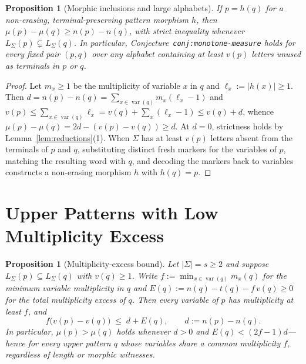 \documentclass[11pt]{article}
\theoremstyle{plain}
\newtheorem{proposition}[theorem]{Proposition}
\theoremstyle{definition}
\theoremstyle{remark}
\DeclareMathOperator{\var}{var}
\begin{document}
\begin{proposition}[Morphic inclusions and large alphabets]\label{prop:morphic}
If $p = h(q)$ for a non-erasing, terminal-preserving pattern morphism $h$, then $\mu(p) - \mu(q) \ge n(p) - n(q)$, with strict inequality whenever $L_\Sigma(p) \subsetneq L_\Sigma(q)$. In particular, Conjecture~\texttt{conj:monotone-measure} holds for every fixed pair $(p, q)$ over any alphabet containing at least $v(p)$ letters unused as terminals in $p$ or $q$.
\end{proposition}

\begin{proof}
Let $m_x \ge 1$ be the multiplicity of variable $x$ in $q$ and $\ell_x := |h(x)| \ge 1$.
Then $d = n(p) - n(q) = \sum_{x \in \var(q)} m_x(\ell_x - 1)$ and $v(p) \le \sum_{x \in \var(q)} \ell_x = v(q) + \sum_{x}(\ell_x - 1) \le v(q) + d$, whence $\mu(p) - \mu(q) = 2d - (v(p) - v(q)) \ge d$.
At $d = 0$, strictness holds by Lemma~\ref{lem:reductions}(1).
When $\Sigma$ has at least $v(p)$ letters absent from the terminals of $p$ and $q$, substituting distinct fresh markers for the variables of $p$, matching the resulting word with $q$, and decoding the markers back to variables constructs a non-erasing morphism $h$ with $h(q) = p$.
\end{proof}

\section{Upper Patterns with Low Multiplicity Excess}

\begin{proposition}[Multiplicity-excess bound]\label{prop:mult}
Let $|\Sigma| = s \ge 2$ and suppose $L_\Sigma(p) \subseteq L_\Sigma(q)$ with $v(q) \ge 1$.
Write $f := \min_{x \in \var(q)} m_x(q)$ for the minimum variable multiplicity in $q$ and $E(q) := n(q) - t(q) - f\,v(q) \ge 0$ for the total multiplicity excess of $q$.
Then every variable of $p$ has multiplicity at least $f$, and
\[
f\bigl(v(p) - v(q)\bigr) \;\le\; d + E(q), \qquad d := n(p) - n(q).
\]
In particular, $\mu(p) > \mu(q)$ holds whenever $d > 0$ and $E(q) < (2f - 1)d$---hence for every upper pattern $q$ whose variables share a common multiplicity $f$, regardless of length or morphic witnesses.
\end{proposition}
\end{document}
